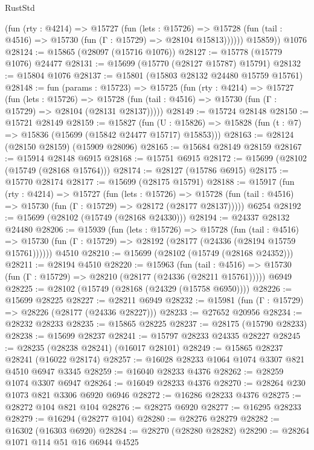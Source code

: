 \begin{lexlean}{RustStd}
\begin{coremodule}
            (fun (rty : @4214) =>
            @15727
              (fun (lets : @15726) =>
              @15728 (fun (tail : @4516) => @15730 (fun (Γ : @15729) => @28104 @15813))))))
        @15859))
    @1076
@28124 := @15865 (@28097 (@15716 @1076))
@28127 := @15778 (@15779 @1076) @24477
@28131 := @15699 (@15770 (@28127 @15787) @15791)
@28132 := @15804 @1076
@28137 := @15801 (@15803 @28132 @24480 @15759 @15761)
@28148 := fun (params : @15723) =>
  @15725
    (fun (rty : @4214) =>
    @15727
      (fun (lets : @15726) =>
      @15728 (fun (tail : @4516) => @15730 (fun (Γ : @15729) => @28104 (@28131 @28137)))))
@28149 := @15724 @28148
@28150 := @15721 @28149
@28159 := @15827
    (fun (U : @15826) => @15828 (fun (t : @7) => @15836 (@15699 (@15842 @24477 @15717) @15853)))
@28163 := @28124 (@28150 @28159) (@15909 @28096)
@28165 := @15684 @28149 @28159
@28167 := @15914 @28148 @6915
@28168 := @15751 @6915
@28172 := @15699 (@28102 (@15749 (@28168 @15764)))
@28174 := @28127 (@15786 @6915)
@28175 := @15770 @28174
@28177 := @15699 (@28175 @15791)
@28188 := @15917
    (fun (rty : @4214) =>
    @15727
      (fun (lets : @15726) =>
      @15728 (fun (tail : @4516) => @15730 (fun (Γ : @15729) => @28172 (@28177 @28137)))))
    @6254
@28192 := @15699 (@28102 (@15749 (@28168 @24330)))
@28194 := @24337 @28132 @24480
@28206 := @15939
    (fun (lets : @15726) =>
    @15728
      (fun (tail : @4516) =>
      @15730 (fun (Γ : @15729) => @28192 (@28177 (@24336 (@28194 @15759 @15761))))))
    @4510
@28210 := @15699 (@28102 (@15749 (@28168 @24352)))
@28211 := @28194 @4510
@28220 := @15963
    (fun (tail : @4516) => @15730 (fun (Γ : @15729) => @28210 (@28177 (@24336 (@28211 @15761)))))
    @6949
@28225 := @28102 (@15749 (@28168 (@24329 (@15758 @6950))))
@28226 := @15699 @28225
@28227 := @28211 @6949
@28232 := @15981 (fun (Γ : @15729) => @28226 (@28177 (@24336 @28227)))
@28233 := @27652 @20956
@28234 := @28232 @28233
@28235 := @15865 @28225
@28237 := @28175 (@15790 @28233)
@28238 := @15699 @28237
@28241 := @15797 @28233 @24335 @28227
@28245 := @28235 (@28238 @28241) (@16017 @28101)
@28249 := @15865 @28237 @28241 (@16022 @28174)
@28257 := @16028 @28233 @1064 @1074 @3307 @821 @4510 @6947 @3345
@28259 := @16040 @28233 @4376
@28262 := @28259 @1074 @3307 @6947
@28264 := @16049 @28233 @4376
@28270 := @28264 @230 @1073 @821 @3306 @6920 @6946
@28272 := @16286 @28233 @4376
@28275 := @28272 @104 @821 @104
@28276 := @28275 @6920
@28277 := @16295 @28233
@28279 := @16294 (@28277 @104)
@28280 := @28276 @28279
@28282 := @16302 (@16303 @6920)
@28284 := @28270 (@28280 @28282)
@28290 := @28264 @1071 @114 @51 @16 @6944 @4525

\end{coremodule}
\end{lexlean}
